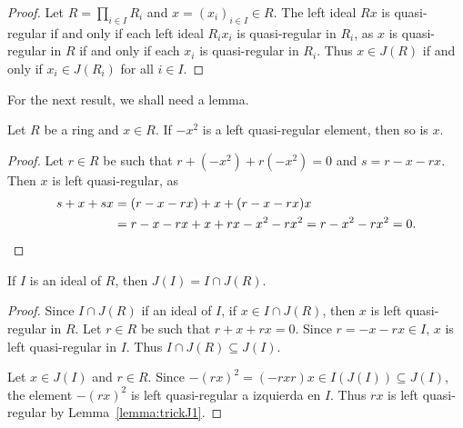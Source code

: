 \begin{proof}
	Let $R=\prod_{i\in I}R_i$ and $x=(x_i)_{i\in I}\in R$.  The left ideal 
    $Rx$ is quasi-regular if and only if each left ideal $R_ix_i$
	is quasi-regular in $R_i$, as $x$ is quasi-regular in $R$ if and only if each 
	$x_i$ is quasi-regular in $R_i$. Thus $x\in J(R)$ if and only if $x_i\in
	J(R_i)$ for all $i\in I$.
\end{proof}

For the next result, we shall need a lemma.

\begin{lemma}
	\label{lemma:trickJ1}
	Let $R$ be a ring and $x\in R$. 
	If $-x^2$ is a left quasi-regular element, then so is $x$. 
\end{lemma}

\begin{proof}
	Let $r\in R$ be such that $r+(-x^2)+r(-x^2)=0$ and $s=r-x-rx$. Then
    $x$ is left quasi-regular, as 
    \begin{align*}
		s+x+sx&=(r-x-rx)+x+(r-x-rx)x\\
		&=r-x-rx+x+rx-x^2-rx^2=r-x^2-rx^2=0.\qedhere 
\end{align*}
\end{proof}

%

\begin{proposition}
	\label{proposition:J(I)}
	If $I$ is an ideal of $R$, then $J(I)=I\cap J(R)$. 
\end{proposition}

\begin{proof}
	Since $I\cap J(R)$ if an ideal of $I$, if $x\in I\cap J(R)$, then $x$ is
	left quasi-regular in $R$. Let $r\in R$ be such that $r+x+rx=0$. 
	Since $r=-x-rx\in I$, $x$ is left quasi-regular 
	in $I$. Thus $I\cap J(R)\subseteq J(I)$. 

	Let $x\in J(I)$ and $r\in R$. Since $-(rx)^2=(-rxr)x\in
	I(J(I))\subseteq J(I)$, the element $-(rx)^2$ is left quasi-regular a izquierda
	en $I$. Thus $rx$ is left quasi-regular by
	Lemma~\ref{lemma:trickJ1}.
\end{proof}

